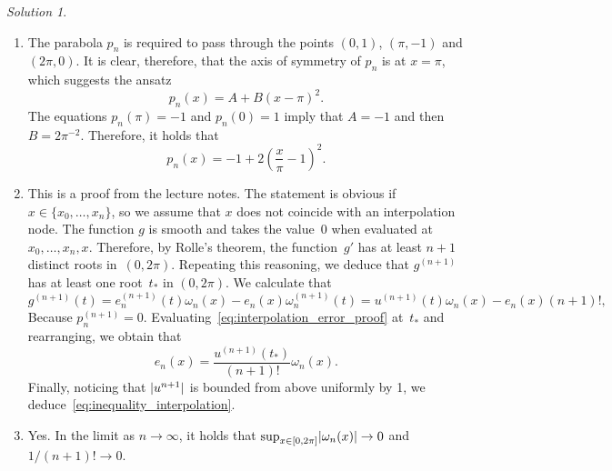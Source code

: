\documentclass[11pt]{article}
\theoremstyle{definition}
\theoremstyle{remark}
\newtheorem*{solution}{Solution}
\begin{document}
\begin{solution}
    $~$
    \begin{enumerate}

        \item
            The parabola $p_n$ is required to pass through the points $(0, 1)$, $(\pi, -1)$ and $(2\pi, 0)$.
            It is clear, therefore, that the axis of symmetry of $p_n$ is at $x = \pi$,
            which suggests the ansatz
            \[
                p_n(x) = A + B (x - \pi)^2.
            \]
            The equations $p_n(\pi) = -1$ and $p_n(0) = 1$ imply that
            $A = -1$ and then $B = 2\pi^{-2}$.
            Therefore, it holds that
            \[
                p_n(x) = -1 + 2 \left(\frac{x}{\pi} - 1\right)^2.
            \]

        \item
            This is a proof from the lecture notes.
            The statement is obvious if $x \in \{x_0, \dotsc, x_n\}$,
            so we assume that $x$ does not coincide with an interpolation node.
            The function $g$ is smooth and takes the value~0 when evaluated at~$x_0, \dotsc, x_n, x$.
            Therefore, by Rolle's theorem, the function~$g'$ has at least $n+1$ distinct roots in~$(0, 2\pi)$.
            Repeating this reasoning, we deduce that $g^{(n+1)}$ has at least one root~$t_*$ in $(0, 2\pi)$.
            We calculate that
            \begin{equation}
                \label{eq:interpolation_error_proof}
                g^{(n+1)}(t) = e_n^{(n+1)}(t) \omega_n(x) - e_n(x) \omega_n^{(n+1)}(t)
                = u^{(n+1)}(t) \omega_n(x) - e_n(x) (n+1)!,
            \end{equation}
            Because $p_n^{(n+1)} = 0$.
            Evaluating~\eqref{eq:interpolation_error_proof} at~$t_*$ and rearranging,
            we obtain that
            \[
                e_n(x) = \frac{u^{(n+1)}(t_*)}{(n+1)!} \omega_n(x).
            \]
            Finally, noticing that $\lvert u^{n+1}\rvert$ is bounded from above uniformly by 1,
            we deduce~\eqref{eq:inequality_interpolation}.

            \item
                Yes. In the limit as $n \to \infty$,
                it holds that $\sup_{x \in [0, 2\pi]} \lvert\omega_n(x)\rvert \to 0$ and $1/(n+1)! \to 0$.
    \end{enumerate}



\end{solution}
\end{document}
